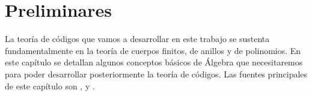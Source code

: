 \chapter{Preliminares}

La teoría de códigos que vamos a desarrollar en este trabajo se sustenta fundamentalmente en la teoría de cuerpos finitos, de anillos y de polinomios.
En este capítulo se detallan algunos conceptos básicos de Álgebra que
necesitaremos para poder desarrollar posteriormente la teoría de códigos.
Las fuentes principales de este capítulo son \parencite[cap. 3 y 6]{cohn_algebra_1982}, \parencite[cap. 3]{cohn_algebra_1989} y \parencite[cap. 2]{lidl_introduction_1986}.






